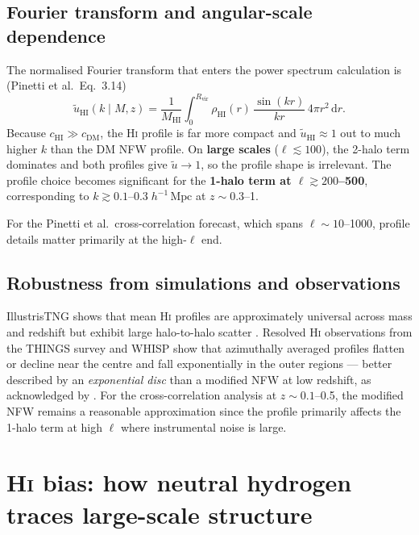 \documentclass[10pt,a4paper]{article}
\newcommand{\MHI}{M_{\mathrm{HI}}}
\newcommand{\cHI}{c_{\mathrm{HI}}}
\newcommand{\rhoHI}{\rho_{\mathrm{HI}}}
\newcommand{\utilde}{\tilde{u}}
\newcommand{\hmpc}{h^{-1}\,\mathrm{Mpc}}
\begin{document}
\subsection{Fourier transform and angular-scale dependence}

The normalised Fourier transform that enters the power spectrum calculation is
(Pinetti et al.\ Eq.~3.14)
\begin{equation}
  \label{eq:uHI}
  \utilde_{\mathrm{HI}}(k \mid M, z) = \frac{1}{\MHI}
  \int_{0}^{R_{\mathrm{vir}}} \rhoHI(r)\,
  \frac{\sin(kr)}{kr}\,4\pi r^{2}\,\mathrm{d}r.
\end{equation}
Because $\cHI \gg c_{\mathrm{DM}}$, the H\textsc{i} profile is far more
compact and $\utilde_{\mathrm{HI}} \approx 1$ out to much higher $k$ than the
DM NFW profile.  On \textbf{large scales} ($\ell \lesssim 100$), the 2-halo
term dominates and both profiles give $\utilde \to 1$, so the profile shape is
irrelevant.  The profile choice becomes significant for the \textbf{1-halo
term at $\ell \gtrsim 200$--500}, corresponding to
$k \gtrsim 0.1$--$0.3\;\hmpc$ at $z \sim 0.3$--1.

For the Pinetti et al.\ cross-correlation forecast, which spans
$\ell \sim 10$--1000, profile details matter primarily at the high-$\ell$ end.


\subsection{Robustness from simulations and observations}

IllustrisTNG shows that mean H\textsc{i} profiles are approximately universal
across mass and redshift but exhibit large halo-to-halo scatter
\citep{VillaescusaNavarro2018}.  Resolved H\textsc{i} observations from the
THINGS survey \citep{Walter2008} and WHISP show that azimuthally averaged
profiles flatten or decline near the centre and fall exponentially in the outer
regions --- better described by an \emph{exponential disc} than a modified NFW
at low redshift, as acknowledged by \citet{Padmanabhan2017}.  For the
cross-correlation analysis at $z \sim 0.1$--0.5, the modified NFW remains a
reasonable approximation since the profile primarily affects the 1-halo term
at high $\ell$ where instrumental noise is large.


\section{H\textsc{i} bias: how neutral hydrogen traces large-scale structure}
\label{sec:bias}
\end{document}
